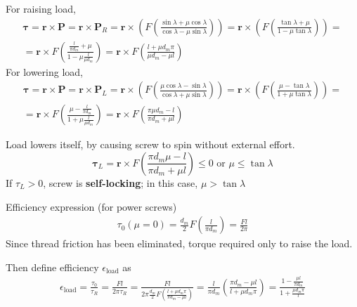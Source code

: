 \documentclass[10pt]{amsart}
\begin{document}
\begin{multicols*}{2}
For raising load, 
\[
\begin{gathered}
	\mathbf{\tau} = \mathbf{r} \times \mathbf{P} = \mathbf{r} \times \mathbf{P}_R = \mathbf{r} \times \left( F \left( \frac{ \sin{ \lambda } + \mu \cos{\lambda} }{ \cos{ \lambda} - \mu \sin{\lambda}  } \right) \right) = \mathbf{r} \times \left( F \left( \frac{ \tan{ \lambda } + \mu  }{ 1 - \mu \tan{\lambda}  } \right) \right) = \\
= \mathbf{r} \times F \left( \frac{ \frac{ l}{ \pi d_m } + \mu }{ 1 - \mu \frac{l}{\mu d_m } } \right) = \mathbf{r} \times F \left( \frac{ l + \mu d_m \pi }{ \mu d_m - \mu l } \right)
\end{gathered}
\]
For lowering load, 
\[
\begin{gathered}
	\mathbf{\tau} = \mathbf{r} \times \mathbf{P} = \mathbf{r} \times \mathbf{P}_L = \mathbf{r} \times \left( F \left( \frac{  \mu \cos{ \lambda } -  \sin{\lambda} }{ \cos{ \lambda} + \mu \sin{\lambda}  } \right) \right) = \mathbf{r} \times \left( F \left(   \frac{ \mu -  \tan{ \lambda }   }{ 1 + \mu \tan{\lambda}  } \right) \right) = \\
= \mathbf{r} \times F \left( \frac{ \mu -  \frac{ l}{ \pi d_m }  }{ 1 + \mu \frac{l}{\mu d_m } } \right) = \mathbf{r} \times F \left( \frac{ \pi \mu d_m - l }{ \pi d_m + \mu l } \right)
\end{gathered}
\]

Load lowers itself, by causing screw to spin without external effort.  
\begin{equation}
	\mathbf{\tau}_L  = \mathbf{r} \times F \left( \frac{ \pi d_m \mu - l }{ \pi d_m + \mu l } \right)  \leq 0 \text{ or } \mu \leq \tan{\lambda} 
\end{equation}
If $\tau_L >0$, screw is \textbf{self-locking}; in this case, $\mu > \tan{\lambda}$

Efficiency expression (for power screws)
\begin{equation}
\begin{gathered}
	\tau_0(\mu = 0)  = \frac{d_m}{2} F\left( \frac{l }{ \pi d_m} \right)  = \frac{Fl}{2\pi }
\end{gathered}
\end{equation}
Since thread friction has been eliminated, torque required only to raise the load.  

Then define efficiency $\epsilon_{\text{load}}$ as 
\begin{equation}
\begin{gathered}
	\epsilon_{\text{load}} = \frac{ \tau_0 }{ \tau_R} = \frac{Fl}{2\pi \tau_R} = \frac{Fl}{ 2\pi  \frac{d_m}{2} F \left( \frac{ l + \mu d_m \pi }{ \pi d_m - \mu l } \right) } = \frac{l}{ \pi d_m} \left( \frac{ \pi d_m - \mu l }{ l + \mu d_m \pi } \right) = \frac{1 - \frac{ \mu l }{ \pi d_m } }{ 1 + \frac{ \mu d_m \pi }{ l }  } 
\end{gathered}
\end{equation}



\end{multicols*}
\end{document}
